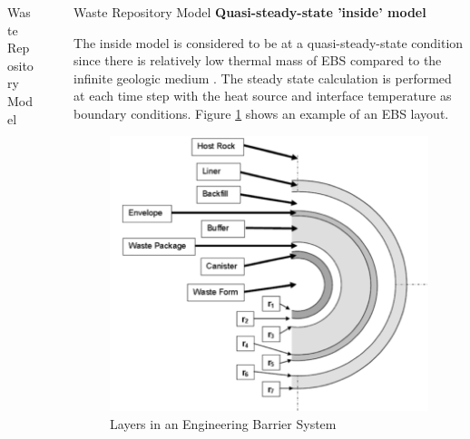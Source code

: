 \documentclass[final]{beamer}
\newlength{\sepwid}
\newlength{\onecolwid}
\newlength{\threecolwid}
\begin{document}
\begin{frame}[t]
\begin{columns}[t,totalwidth=\threecolwid]
\begin{column}{\onecolwid}
\begin{block}{Waste Repository Model}
\end{block}



\end{column} %

\begin{column}{\sepwid}\end{column} %

\begin{column}{\onecolwid} %

\begin{block}{Waste Repository Model}
\textbf{Quasi-steady-state 'inside' model}

The inside model is considered to be at a quasi-steady-state condition since there is 
relatively low thermal mass of \gls{EBS} compared to the infinite geologic medium 
\cite{sutton_investigations_2011}. 
The steady state calculation is performed at each time step with the heat source and 
interface temperature as boundary conditions. 
Figure \ref{fig:ebs_layers} shows an example of an \gls{EBS} layout.

\begin{figure}
	\label{fig:ebs_layers}
	\includegraphics[width=0.9\linewidth]{ebs_layers}
	\caption{Layers in an Engineering Barrier System \cite{sutton_investigations_2011}}
\end{figure}

\end{block}



\end{column}
\end{columns}
\end{frame}
\end{document}
